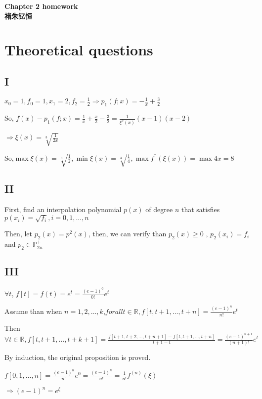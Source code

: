 \documentclass[12]{article}%
\begin{document}
\begin{center}
    \LARGE\songti\textbf{Chapter 2 homework} \\%
    \large\kaishu\textbf{褚朱钇恒}%
\end{center}
    \section{Theoretical questions}
        \subsection{I}
            $x_0=1,f_0=1,x_1=2,f_2=\frac{1}{2} \Rightarrow p_1(f;x)=-\frac{1}{x}+\frac{3}{2}$

            So, $f(x)-p_1(f;x)=\frac{1}{x}+\frac{x}{2}-\frac{3}{2}=\frac{1}{\xi^3(x)}(x-1)(x-2)$

            $\Rightarrow \xi(x)=\sqrt[3]{\frac{1}{2x}}$

            So,$\max \xi(x)=\sqrt[3]{\frac{1}{2}},\min \xi(x)=\sqrt[3]{\frac{1}{4}},\max f^{''}(\xi(x))=\max 4x=8$

        \subsection{II}
            First, find an interpolation polynomial $p(x)$ of degree $n$ that satisfies $p(x_i)=\sqrt{f_i},i=0,1,\dots,n$

            Then, let $p_2(x)=p^2(x)$, then, we can verify than $p_2(x)\ge0$ , $p_2(x_i)=f_i$ and $p_2\in \mathbb{P}^+_{2n}$
        
        \subsection{III}
            $\forall t$, $f[t]=f(t)=e^t=\frac{(e-1)^0}{0!}e^t$

            Assume than when $n=1,2,\dots,k$,$forall t\in \mathbb{R}, f[t,t+1,\dots,t+n]=\frac{(e-1)^n}{n!}e^t$

            Then $\forall t\in\mathbb{R}, f[t,t+1,\dots,t+k+1]=\frac{f[t+1,t+2,\dots,t+n+1]-f[t,t+1,\dots,t+n]}{t+1-t}=\frac{(e-1)^{n+1}}{(n+1)!}e^t$

            By induction, the original proposition is proved.

            $f[0,1,\dots,n]=\frac{(e-1)^n}{n!}e^0=\frac{(e-1)^n}{n!}=\frac{1}{n!}f^{(n)}(\xi)$

            $\Rightarrow (e-1)^n=e^{\xi}$
\end{document}
